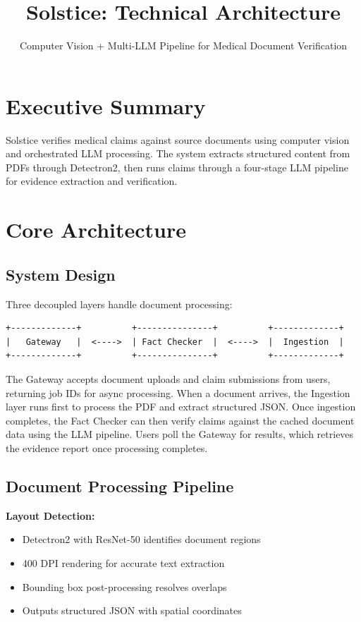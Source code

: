 \documentclass[11pt]{article}
\title{\textbf{Solstice: Technical Architecture}}
\author{Computer Vision + Multi-LLM Pipeline for Medical Document Verification}
\date{}
\begin{document}
\maketitle

\section{Executive Summary}

Solstice verifies medical claims against source documents using computer vision and orchestrated LLM processing. The system extracts structured content from PDFs through Detectron2, then runs claims through a four-stage LLM pipeline for evidence extraction and verification.

\section{Core Architecture}

\subsection{System Design}

Three decoupled layers handle document processing:

\begin{verbatim}
+-------------+          +---------------+          +-------------+
|   Gateway   |  <---->  | Fact Checker  |  <---->  |  Ingestion  |
+-------------+          +---------------+          +-------------+
\end{verbatim}

The Gateway accepts document uploads and claim submissions from users, returning job IDs for async processing. When a document arrives, the Ingestion layer runs first to process the PDF and extract structured JSON. Once ingestion completes, the Fact Checker can then verify claims against the cached document data using the LLM pipeline. Users poll the Gateway for results, which retrieves the evidence report once processing completes.

\subsection{Document Processing Pipeline}

\textbf{Layout Detection:}
\begin{itemize}
\item Detectron2 with ResNet-50 identifies document regions
\item 400 DPI rendering for accurate text extraction
\item Bounding box post-processing resolves overlaps
\item Outputs structured JSON with spatial coordinates
\end{itemize}
\end{document}
